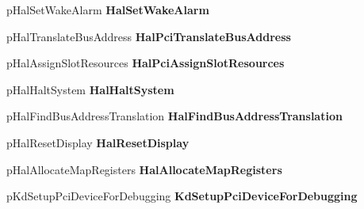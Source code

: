 \begin{DoxyCompactItemize}
\item 
\mbox{\label{struct___h_a_l___p_r_i_v_a_t_e___d_i_s_p_a_t_c_h_afa42fe70189d63cb8cf0445c078bdaac}} 
p\+Hal\+Set\+Wake\+Alarm {\bfseries Hal\+Set\+Wake\+Alarm}
\item 
\mbox{\label{struct___h_a_l___p_r_i_v_a_t_e___d_i_s_p_a_t_c_h_abb85f28b47d59aa39e77179e0b36fa46}} 
p\+Hal\+Translate\+Bus\+Address {\bfseries Hal\+Pci\+Translate\+Bus\+Address}
\item 
\mbox{\label{struct___h_a_l___p_r_i_v_a_t_e___d_i_s_p_a_t_c_h_a03ca7f54865a11d6437455430b1728cd}} 
p\+Hal\+Assign\+Slot\+Resources {\bfseries Hal\+Pci\+Assign\+Slot\+Resources}
\item 
\mbox{\label{struct___h_a_l___p_r_i_v_a_t_e___d_i_s_p_a_t_c_h_adc4cbc6711feeb0b5104808f273258a2}} 
p\+Hal\+Halt\+System {\bfseries Hal\+Halt\+System}
\item 
\mbox{\label{struct___h_a_l___p_r_i_v_a_t_e___d_i_s_p_a_t_c_h_a2075a58a20c2b55b1a092d230ac3b478}} 
p\+Hal\+Find\+Bus\+Address\+Translation {\bfseries Hal\+Find\+Bus\+Address\+Translation}
\item 
\mbox{\label{struct___h_a_l___p_r_i_v_a_t_e___d_i_s_p_a_t_c_h_aa3eea6a61417eb01f4e353d4dc37b16a}} 
p\+Hal\+Reset\+Display {\bfseries Hal\+Reset\+Display}
\item 
\mbox{\label{struct___h_a_l___p_r_i_v_a_t_e___d_i_s_p_a_t_c_h_a40f2378d6bc28a1b5516108131c09811}} 
p\+Hal\+Allocate\+Map\+Registers {\bfseries Hal\+Allocate\+Map\+Registers}
\item 
\mbox{\label{struct___h_a_l___p_r_i_v_a_t_e___d_i_s_p_a_t_c_h_a5887b62e053d649bbe8e3da96145ac8d}} 
p\+Kd\+Setup\+Pci\+Device\+For\+Debugging {\bfseries Kd\+Setup\+Pci\+Device\+For\+Debugging}
\item 
\mbox{\label{struct___h_a_l___p_r_i_v_a_t_e___d_i_s_p_a_t_c_h_a9d64c3f999314a0f785336f4cb062ec7}} 

\end{DoxyCompactItemize}
